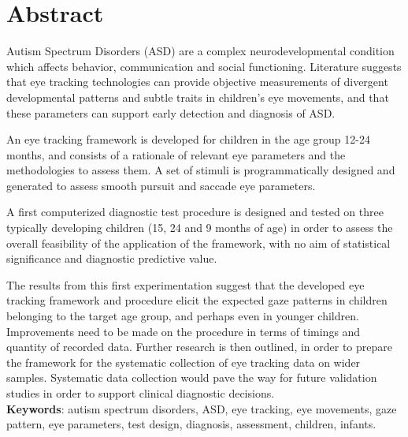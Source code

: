 \chapter*{Abstract}

Autism Spectrum Disorders (ASD) are a complex neurodevelopmental condition which affects behavior, communication and social functioning. Literature suggests that eye tracking technologies can provide objective measurements of divergent developmental patterns and subtle traits in children’s eye movements, and that these parameters can support early detection and diagnosis of ASD.

An eye tracking framework is developed for children in the age group 12-24 months, and consists of a rationale of relevant eye parameters and the methodologies to assess them. A set of stimuli is programmatically designed and generated to assess smooth pursuit and saccade eye parameters.

A first computerized diagnostic test procedure is designed and tested on three typically developing children (15, 24 and 9 months of age) in order to assess the overall feasibility of the application of the framework, with no aim of statistical significance and diagnostic predictive value.

The results from this first experimentation suggest that the developed eye tracking framework and procedure elicit the expected gaze patterns in children belonging to the target age group, and perhaps even in younger children. Improvements need to be made on the procedure in terms of timings and quantity of recorded data. Further research is then outlined, in order to prepare the framework for the systematic collection of eye tracking data on wider samples. Systematic data collection would pave the way for future validation studies in order to support clinical diagnostic decisions.
\\[1cm]

\textbf{Keywords}: autism spectrum disorders, ASD, eye tracking, eye movements, gaze pattern, eye parameters, test design, diagnosis, assessment, children, infants.

\hypersetup{pageanchor=false}